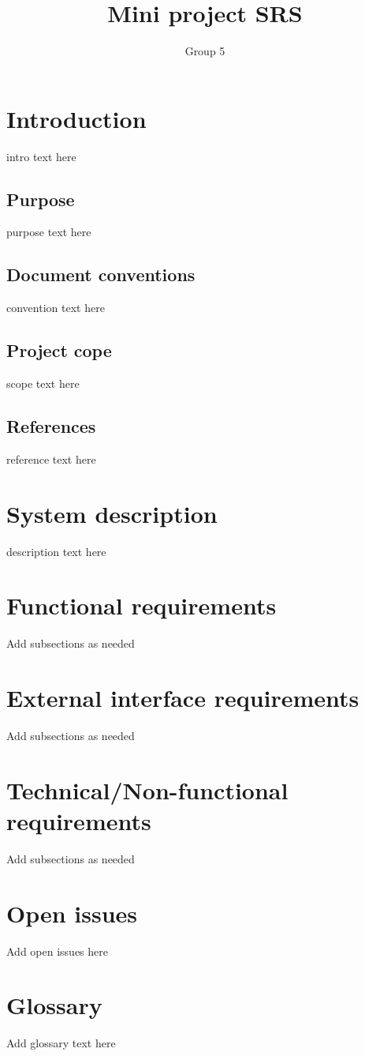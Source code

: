 \documentclass[10pt,a4paper]{article}
\author{Group 5}
\title{Mini project SRS}
\begin{document}
\tableofcontents
\pagebreak
\section{Introduction}
intro text here
\subsection{Purpose}
purpose text here
\subsection{Document conventions}
convention text here
\subsection{Project cope}
scope text here
\subsection{References}
reference text here
\section{System description}
description text here
\section{Functional requirements}
Add subsections as needed
\section{External interface requirements}
Add subsections as needed
\section{Technical/Non-functional requirements}
Add subsections as needed
\section{Open issues}
Add open issues here
\section{Glossary}
Add glossary text here
\end{document}
